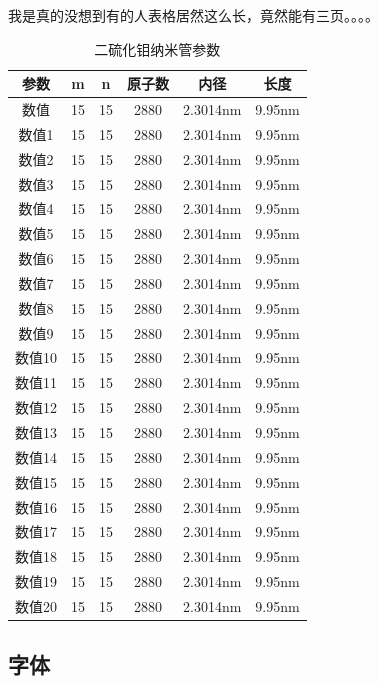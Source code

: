 \documentclass[AutoFakeBold]{template/LZUThesis2021_master}
\begin{document}
我是真的没想到有的人表格居然这么长，竟然能有三页。。。。


\begin{longtable}{cccccc} %
    \caption{二硫化钼纳米管参数}\label{tbl_mos2_nanotube}\\
    \toprule
    参数& m & n & 原子数 & 内径 & 长度\\
    \midrule
    数值 & 15 & 15  & 2880 & 2.3014nm & 9.95nm \\
    数值1 & 15 & 15  & 2880 & 2.3014nm & 9.95nm \\
    数值2 & 15 & 15  & 2880 & 2.3014nm & 9.95nm \\
    数值3 & 15 & 15  & 2880 & 2.3014nm & 9.95nm \\
    数值4 & 15 & 15  & 2880 & 2.3014nm & 9.95nm \\
    数值5 & 15 & 15  & 2880 & 2.3014nm & 9.95nm \\
    数值6 & 15 & 15  & 2880 & 2.3014nm & 9.95nm \\
    数值7 & 15 & 15  & 2880 & 2.3014nm & 9.95nm \\
    数值8 & 15 & 15  & 2880 & 2.3014nm & 9.95nm \\
    数值9 & 15 & 15  & 2880 & 2.3014nm & 9.95nm \\
    数值10 & 15 & 15  & 2880 & 2.3014nm & 9.95nm \\
    数值11 & 15 & 15  & 2880 & 2.3014nm & 9.95nm \\
    数值12 & 15 & 15  & 2880 & 2.3014nm & 9.95nm \\
    数值13 & 15 & 15  & 2880 & 2.3014nm & 9.95nm \\
    数值14 & 15 & 15  & 2880 & 2.3014nm & 9.95nm \\
    数值15 & 15 & 15  & 2880 & 2.3014nm & 9.95nm \\
    数值16 & 15 & 15  & 2880 & 2.3014nm & 9.95nm \\
    数值17 & 15 & 15  & 2880 & 2.3014nm & 9.95nm \\
    数值18 & 15 & 15  & 2880 & 2.3014nm & 9.95nm \\
    数值19 & 15 & 15  & 2880 & 2.3014nm & 9.95nm \\
    数值20 & 15 & 15  & 2880 & 2.3014nm & 9.95nm \\
    \bottomrule
\end{longtable}

    



\subsection{字体} %
\label{sub:字体}
\end{document}
